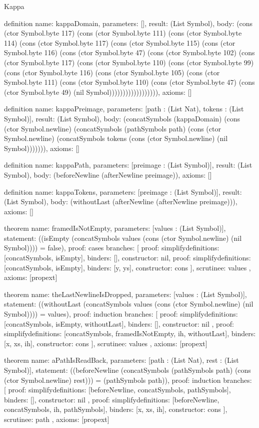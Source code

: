 \begin{lexlean}{Kappa}
\begin{semanticmodule}
definition{
  name: kappaDomain,
  parameters: [],
  result: (List Symbol),
  body: (cons (ctor Symbol.byte 117) (cons (ctor Symbol.byte 111) (cons (ctor Symbol.byte 114) (cons (ctor Symbol.byte 117) (cons (ctor Symbol.byte 115) (cons (ctor Symbol.byte 116) (cons (ctor Symbol.byte 47) (cons (ctor Symbol.byte 102) (cons (ctor Symbol.byte 117) (cons (ctor Symbol.byte 110) (cons (ctor Symbol.byte 99) (cons (ctor Symbol.byte 116) (cons (ctor Symbol.byte 105) (cons (ctor Symbol.byte 111) (cons (ctor Symbol.byte 110) (cons (ctor Symbol.byte 47) (cons (ctor Symbol.byte 49) (nil Symbol)))))))))))))))))),
  axioms: []
}

definition{
  name: kappaPreimage,
  parameters: [path : (List Nat), tokens : (List Symbol)],
  result: (List Symbol),
  body: (concatSymbols (kappaDomain) (cons (ctor Symbol.newline) (concatSymbols (pathSymbols path) (cons (ctor Symbol.newline) (concatSymbols tokens (cons (ctor Symbol.newline) (nil Symbol))))))),
  axioms: []
}

definition{
  name: kappaPath,
  parameters: [preimage : (List Symbol)],
  result: (List Symbol),
  body: (beforeNewline (afterNewline preimage)),
  axioms: []
}

definition{
  name: kappaTokens,
  parameters: [preimage : (List Symbol)],
  result: (List Symbol),
  body: (withoutLast (afterNewline (afterNewline preimage))),
  axioms: []
}

theorem{
  name: framedIsNotEmpty,
  parameters: [values : (List Symbol)],
  statement: ((isEmpty (concatSymbols values (cons (ctor Symbol.newline) (nil Symbol)))) = false),
  proof: cases{
    branches: [
      {proof: simplify{definitions: [concatSymbols, isEmpty]}, binders: [], constructor: nil},
      {proof: simplify{definitions: [concatSymbols, isEmpty]}, binders: [y, ys], constructor: cons}
    ],
    scrutinee: values
  },
  axioms: [propext]
}

theorem{
  name: theLastNewlineIsDropped,
  parameters: [values : (List Symbol)],
  statement: ((withoutLast (concatSymbols values (cons (ctor Symbol.newline) (nil Symbol)))) = values),
  proof: induction{
    branches: [
      {
        proof: simplify{definitions: [concatSymbols, isEmpty, withoutLast]},
        binders: [],
        constructor: nil
      },
      {
        proof: simplify{definitions: [concatSymbols, framedIsNotEmpty, ih, withoutLast]},
        binders: [x, xs, ih],
        constructor: cons
      }
    ],
    scrutinee: values
  },
  axioms: [propext]
}

theorem{
  name: aPathIsReadBack,
  parameters: [path : (List Nat), rest : (List Symbol)],
  statement: ((beforeNewline (concatSymbols (pathSymbols path) (cons (ctor Symbol.newline) rest))) = (pathSymbols path)),
  proof: induction{
    branches: [
      {
        proof: simplify{definitions: [beforeNewline, concatSymbols, pathSymbols]},
        binders: [],
        constructor: nil
      },
      {
        proof: simplify{definitions: [beforeNewline, concatSymbols, ih, pathSymbols]},
        binders: [x, xs, ih],
        constructor: cons
      }
    ],
    scrutinee: path
  },
  axioms: [propext]
}


\end{semanticmodule}
\end{lexlean}
